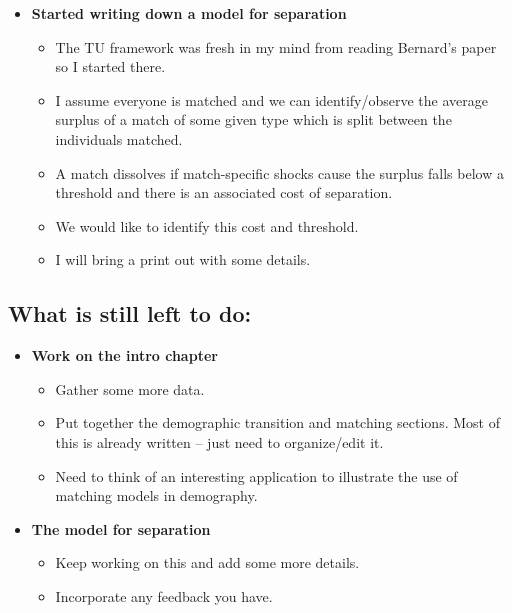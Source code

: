 \documentclass{article}
\begin{document}
\begin{itemize}
\item \textbf{Started writing down a model for separation}
\begin{itemize}
\item The TU framework was fresh in my mind from reading Bernard's paper so I started there.
\item I assume everyone is matched and we can identify/observe the average surplus of a match of some given type which is split between the individuals matched.
\item A match dissolves if match-specific shocks cause the surplus falls below a threshold and there is an associated cost of separation.
\item We would like to identify this cost and threshold. 
\item I will bring a print out with some details.
\end{itemize}



\end{itemize}

\subsection*{What is still left to do:}
\begin{itemize}
\item \textbf{Work on the intro chapter}
\begin{itemize}
\item Gather some more data.
\item Put together the demographic transition and matching sections. Most of this is already written -- just need to organize/edit it.
\item Need to think of an interesting application to illustrate the use of matching models in demography.
\end{itemize}
\item \textbf{The model for separation}
\begin{itemize}
\item Keep working on this and add some more details.
\item Incorporate any feedback you have.
\end{itemize}
\end{itemize}

\newpage


\end{document}
